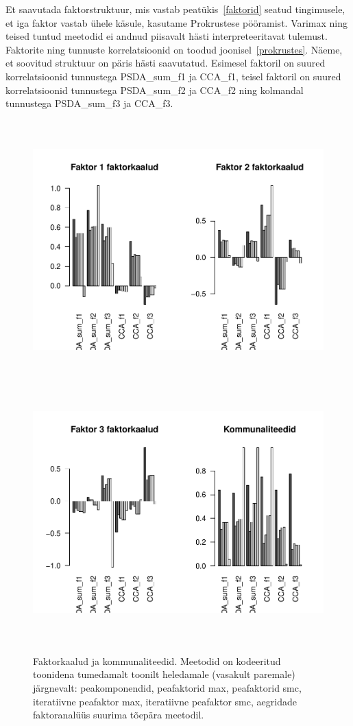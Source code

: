\documentclass[a4paper,12pt]{report}
\begin{document}
Et saavutada faktorstruktuur, mis vastab peatükis~\ref{faktorid} seatud tingimusele, et iga faktor vastab ühele käsule, kasutame Prokrustese pööramist. Varimax ning teised tuntud meetodid ei andnud piisavalt hästi interpreteeritavat tulemust. Faktorite ning tunnuste korrelatsioonid on toodud joonisel~\ref{prokrustes}. Näeme, et soovitud struktuur on päris hästi saavutatud. Esimesel faktoril on suured korrelatsioonid tunnustega PSDA\_sum\_f1 ja CCA\_f1, teisel faktoril on suured korrelatsioonid tunnustega PSDA\_sum\_f2 ja CCA\_f2 ning kolmandal tunnustega PSDA\_sum\_f3 ja CCA\_f3.

\begin{figure}[h!]
	\centering
	\includegraphics[height=10cm]{kaalud1.pdf}
	\includegraphics[height=10cm]{kaalud2.pdf}
	\caption{Faktorkaalud ja kommunaliteedid. Meetodid on kodeeritud toonidena tumedamalt toonilt heledamale (vasakult paremale) järgnevalt: peakomponendid, peafaktorid max, peafaktorid smc, iteratiivne peafaktor max, iteratiivne peafaktor smc, aegridade faktoranalüüs suurima tõepära meetodil.}\label{kaalud}
\end{figure}
\end{document}
